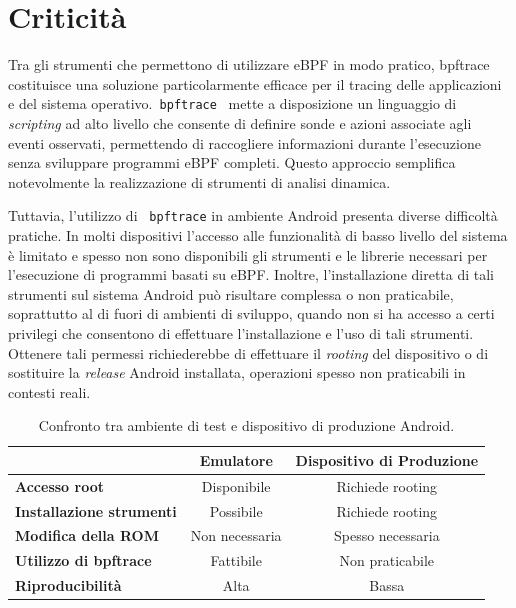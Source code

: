 \section{Criticità}
Tra gli strumenti che permettono di utilizzare eBPF in modo pratico, bpftrace costituisce una soluzione particolarmente efficace per 
il tracing delle applicazioni e del sistema operativo.\texttt{ bpftrace}~\cite{bpftrace_docs} mette a disposizione un linguaggio di \textit{scripting} ad alto livello che 
consente di definire sonde e azioni associate agli eventi osservati, permettendo di raccogliere informazioni durante l’esecuzione senza 
sviluppare programmi eBPF completi. Questo approccio semplifica notevolmente la realizzazione di strumenti di analisi dinamica.

Tuttavia, l’utilizzo di \texttt{ bpftrace} in ambiente Android presenta diverse difficoltà pratiche. In molti dispositivi l’accesso alle 
funzionalità di basso livello del sistema è limitato e spesso non sono disponibili gli strumenti e le librerie necessari per l’esecuzione di programmi basati su eBPF. Inoltre, l’installazione diretta di tali strumenti sul sistema Android può risultare complessa 
o non praticabile, soprattutto al di fuori di ambienti di sviluppo, quando non si ha accesso a certi privilegi che consentono 
di effettuare l'installazione e l'uso di tali strumenti. Ottenere tali 
permessi richiederebbe di effettuare il \textit{rooting} del dispositivo o di sostituire la \textit{release}
Android installata, operazioni spesso non praticabili in contesti reali.

\begin{table}[h]
    \centering
    \begin{tabular}{lcc}
        \toprule
        & \textbf{Emulatore} & \textbf{Dispositivo di Produzione} \\
        \midrule
        \textbf{Accesso root}           & Disponibile     & Richiede rooting   \\
        \textbf{Installazione strumenti} & Possibile       & Richiede rooting  \\
        \textbf{Modifica della ROM}     & Non necessaria  & Spesso necessaria \\
        \textbf{Utilizzo di bpftrace}   & Fattibile       & Non praticabile   \\
        \textbf{Riproducibilità}        & Alta            & Bassa             \\
        \bottomrule
    \end{tabular}
    \caption{Confronto tra ambiente di test e dispositivo di produzione Android.}
    \label{fig:confronto-ambienti}
\end{table}

